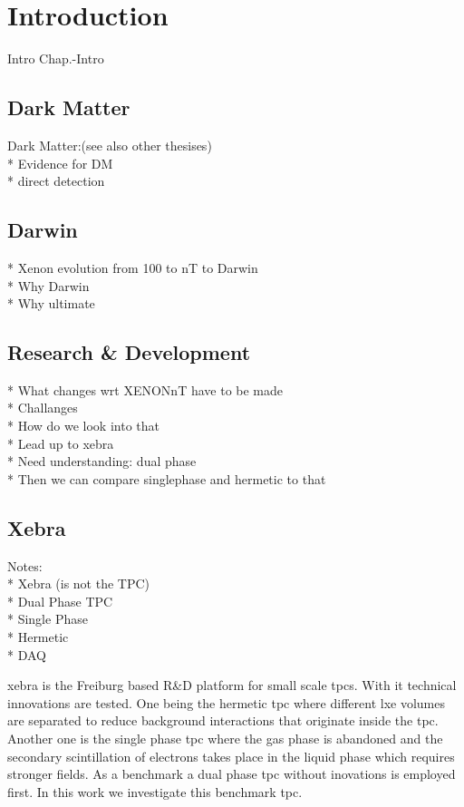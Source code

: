 \chapter{Introduction}
\label{chap:Intro}

Intro Chap.-Intro

\FloatBarrier
\section{Dark Matter}
\label{sec:DarkMatter}
\FloatBarrier

Dark Matter:(see also other thesises) \\
* Evidence for DM \\
* direct detection


\newpage
\FloatBarrier
\section{Darwin}
\label{sec:Darwin}
\FloatBarrier

* Xenon evolution from 100 to nT to Darwin \\
* Why Darwin \\
* Why ultimate


\newpage
\FloatBarrier
\section{Research \& Development}
\label{sec:RnD}
\FloatBarrier

* What changes wrt XENONnT have to be made \\
* Challanges \\
* How do we look into that \\
* Lead up to xebra \\
* Need understanding: dual phase \\
* Then we can compare singlephase and hermetic to that


\newpage
\FloatBarrier
\section{Xebra}
\label{sec:Xebra}
\FloatBarrier

Notes: \\
* Xebra (is not the TPC) \\
* Dual Phase TPC \\
* Single Phase \\
* Hermetic \\
* DAQ

\gls{xebra} is the Freiburg based \darwin R\&D platform for small scale \gls{tpc}s.
With it technical innovations are tested.
One being the hermetic \gls{tpc} where different \gls{lxe} volumes are separated to reduce background interactions that originate inside the \gls{tpc}.
Another one is the single phase \gls{tpc} where the gas phase is abandoned and the secondary scintillation of electrons takes place in the liquid phase which requires stronger fields.
As a benchmark a dual phase \gls{tpc} without inovations is employed first.
In this work we investigate this benchmark \gls{tpc}.


